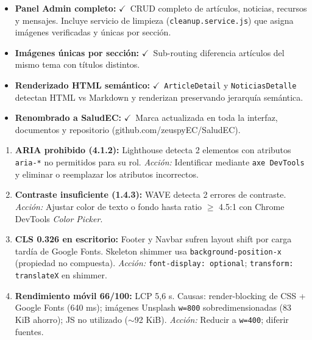 \documentclass[12pt, a4paper]{article}
\newcommand{\cmark}{\textcolor{successgreen}{$\checkmark$}}
\begin{document}
\begin{successbox}
\begin{itemize}
  \item \textbf{Panel Admin completo:} \cmark~CRUD completo de artículos, noticias, recursos y mensajes. Incluye servicio de limpieza (\texttt{cleanup.service.js}) que asigna imágenes verificadas y únicas por sección.
  \item \textbf{Imágenes únicas por sección:} \cmark~Sub-routing diferencia artículos del mismo tema con títulos distintos.
  \item \textbf{Renderizado HTML semántico:} \cmark~\texttt{ArticleDetail} y \texttt{NoticiasDetalle} detectan HTML vs Markdown y renderizan preservando jerarquía semántica.
  \item \textbf{Renombrado a SaludEC:} \cmark~Marca actualizada en toda la interfaz, documentos y repositorio (github.com/zeuspyEC/SaludEC).
\end{itemize}
\end{successbox}

\begin{warnbox}
\begin{enumerate}
  \item \textbf{ARIA prohibido (4.1.2):} Lighthouse detecta 2 elementos con atributos \texttt{aria-*} no permitidos para su rol. \textit{Acción:} Identificar mediante \texttt{axe DevTools} y eliminar o reemplazar los atributos incorrectos.
  \item \textbf{Contraste insuficiente (1.4.3):} WAVE detecta 2 errores de contraste. \textit{Acción:} Ajustar color de texto o fondo hasta ratio $\geq$ 4.5:1 con Chrome DevTools \textit{Color Picker}.
  \item \textbf{CLS 0.326 en escritorio:} Footer y Navbar sufren layout shift por carga tardía de Google Fonts. Skeleton shimmer usa \texttt{background-position-x} (propiedad no compuesta). \textit{Acción:} \texttt{font-display: optional}; \texttt{transform: translateX} en shimmer.
  \item \textbf{Rendimiento móvil 66/100:} LCP 5,6 s. Causas: render-blocking de CSS + Google Fonts (640 ms); imágenes Unsplash \texttt{w=800} sobredimensionadas (83 KiB ahorro); JS no utilizado ($\sim$92 KiB). \textit{Acción:} Reducir a \texttt{w=400}; diferir fuentes.
\end{enumerate}
\end{warnbox}
\end{document}

